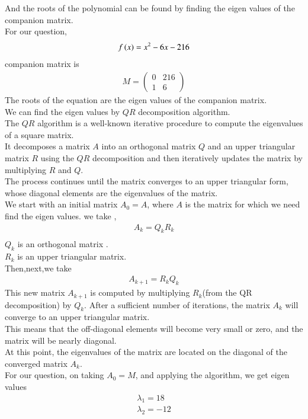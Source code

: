 \documentclass[journal]{IEEEtran}
\begin{document}
And the roots of the polynomial can be found by finding the eigen values of the companion matrix.\\
For our question,
\begin{align}
    f\left(x\right) = x^2 - 6x - 216
\end{align}
companion matrix is
\begin{align}
    M = \begin{pmatrix}
        0&216\\
        1&6
    \end{pmatrix}
\end{align}
The roots of the equation are the eigen values of the companion matrix.\\
We can find the eigen values by $QR$ decomposition algorithm.\\
The $QR$ algorithm is a well-known iterative procedure to compute the eigenvalues of a square matrix.\\
It decomposes a matrix $A$ into an orthogonal matrix $Q$ and an upper triangular matrix $R$ using the $QR$ decomposition and then iteratively updates the matrix by multiplying $R$ and $Q$.\\
The process continues until the matrix converges to an upper triangular form, whose diagonal elements are the eigenvalues of the matrix.\\
We start with an initial matrix $A_0 = A$, where $A$ is the matrix for which we need find the eigen values.
we take , 
\begin{align}
    A_k = Q_kR_k\\
\end{align}
$Q_k$ is an orthogonal matrix .\\
$R_k$ is an upper triangular matrix.\\
Then,next,we take
\begin{align}
    A_{k+1} = R_kQ_k
\end{align}
This new matrix $A_{k+1}$ is computed by multiplying $R_k$(from the QR decomposition) by $Q_k$.
After a sufficient number of iterations, the matrix $A_k$ will converge to an upper triangular matrix.\\
This means that the off-diagonal elements will become very small or zero, and the matrix will be nearly diagonal.\\
At this point, the eigenvalues of the matrix are located on the diagonal of the converged matrix $A_k$.\\
For our question, on taking $A_0 = M$, and applying the algorithm, we get eigen values
\begin{align}
    \lambda_1 = 18\\
    \lambda_2 = -12
\end{align}
\end{document}
